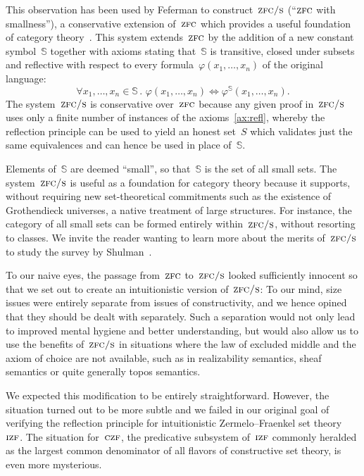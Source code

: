 \documentclass[oneside,reqno]{amsart}
\theoremstyle{definition}
\theoremstyle{plain}
\theoremstyle{remark}
\renewcommand{\SS}{\mathbb{S}}
\renewcommand{\_}{\mathpunct{.}\,}
\newcommand{\?}{\,{:}\,}
\newcommand{\IZF}{\textsc{izf}}
\newcommand{\CZF}{\textsc{czf}}
\newcommand{\ZFC}{\textsc{zfc}}
\newcommand{\ZFCS}{\textsc{zfc/s}}
\begin{document}
This observation has been used by Feferman to construct~$\ZFCS$ (``$\ZFC$ with
smallness''), a conservative extension of~$\ZFC$ which provides a useful
foundation of category theory~\cite{feferman:zfcs}. This system extends~$\ZFC$
by the addition of a new constant symbol~$\SS$ together with axioms stating
that~$\SS$ is transitive, closed under subsets and reflective with respect to
every formula~$\varphi(x_1,\ldots,x_n)$ of the original language:
\[ \label{ax:refl}\tag{$\star$}
\forall x_1,\ldots,x_n \in \SS\_ \varphi(x_1,\ldots,x_n) \Leftrightarrow
\varphi^{\SS}(x_1,\ldots,x_n). \]
The system~$\ZFCS$ is conservative over~$\ZFC$ because any given proof in~$\ZFCS$ uses
only a finite number of instances of the axioms~\eqref{ax:refl}, whereby the reflection
principle can be used to yield an honest set~$S$ which validates just the same equivalences
and can hence be used in place of~$\SS$.

Elements of~$\SS$ are deemed ``small'', so that~$\SS$ is the set of all small
sets. The system~$\ZFCS$ is useful as a foundation for category theory because
it supports, without requiring new set-theoretical commitments such as the
existence of Grothendieck universes, a native treatment of large structures.
For instance, the category of all small sets can be formed entirely
within~$\ZFCS$, without resorting to classes. We invite the reader wanting
to learn more about the merits of~$\ZFCS$ to study the survey by
Shulman~\cite[Section~11]{shulman:sets}.

To our naive eyes, the passage from~$\ZFC$ to~$\ZFCS$ looked sufficiently
innocent so that we set out to create an intuitionistic version of~$\ZFCS$: To
our mind, size issues were entirely separate from issues of constructivity, and
we hence opined that they should be dealt with separately. Such a separation
would not only lead to improved mental hygiene and better understanding, but
would also allow us to use the benefits
of~$\ZFCS$ in situations where the law of excluded middle and the axiom of
choice are not available, such as in realizability semantics, sheaf semantics
or quite generally topos semantics.

We expected this modification to be entirely straightforward. However, the
situation turned out to be more subtle and we failed in our original goal of
verifying the reflection principle for intuitionistic Zermelo--Fraenkel set
theory~$\IZF$. The situation for~$\CZF$, the predicative subsystem of~$\IZF$
commonly heralded as the largest common denominator of all flavors of
constructive set theory, is even more mysterious.
\end{document}
